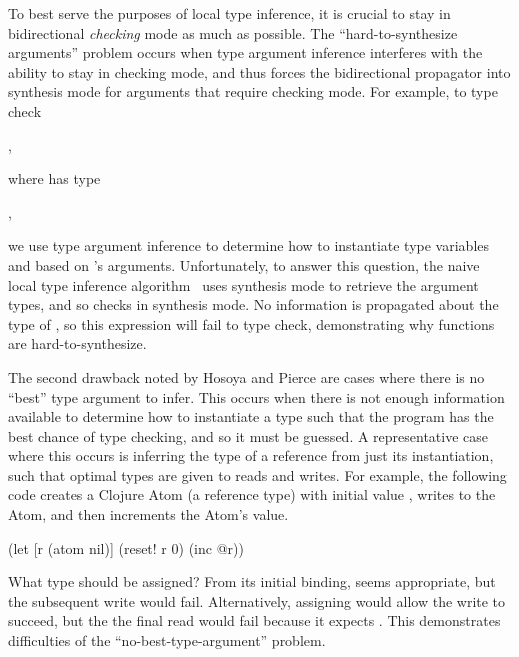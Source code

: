 To best serve the purposes of local type inference, it is crucial to stay in
bidirectional \emph{checking} mode as much as possible.
The ``hard-to-synthesize arguments'' problem occurs when type argument
inference interferes with the ability to stay in checking mode, and
thus forces the bidirectional propagator into synthesis mode
for arguments that require checking mode.
For example, to type check

,

where  has type

,

we use type argument inference to determine how to instantiate type variables 
and  based on 's arguments.
Unfortunately, 
to answer this question,
the naive local type inference algorithm~\cite{PierceLTI}
uses synthesis mode to retrieve the argument types,
and so checks  in synthesis mode.
No information is propagated about the type of ,
so this expression will fail to type check, demonstrating
why functions are hard-to-synthesize.

The second drawback noted by Hosoya and Pierce are
cases where there is no ``best'' type argument to infer.
This occurs when there is not enough information available
to determine how to instantiate a type such that the program
has the best chance of type checking, and so it must be guessed.
A representative case where this occurs is inferring the
type of a reference from just its instantiation, such
that optimal types are given to reads and writes.
For example, the following code creates a Clojure Atom
(a reference type) with initial value , writes
 to the Atom, and then increments the Atom's value.

{
\begin{cljlisting}
(let [r (atom nil)]
  (reset! r 0)
  (inc @r))
\end{cljlisting}
}

What type should  be assigned? From its initial binding,
 seems appropriate, but the subsequent write
would fail. Alternatively, assigning  would
allow the write to succeed, but the the final read would fail
because it expects .
This demonstrates difficulties of the ``no-best-type-argument'' problem.

